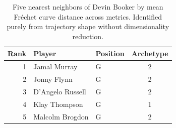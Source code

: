 \begin{table}[htbp]
  \centering\small
  \begin{tabular}{rllc}
    \toprule
    Rank & Player & Position & Archetype \\
    \midrule
    1 & Jamal Murray & G & 2 \\
    2 & Jonny Flynn & G & 2 \\
    3 & D'Angelo Russell & G & 2 \\
    4 & Klay Thompson & G & 1 \\
    5 & Malcolm Brogdon & G & 2 \\
    \bottomrule
  \end{tabular}
  \caption{Five nearest neighbors of Devin Booker by mean Fr\'{e}chet curve distance across metrics. Identified purely from trajectory shape without dimensionality reduction.}
  \label{tab:Devin_Booker_frechet_curve_neighbors}
\end{table}

